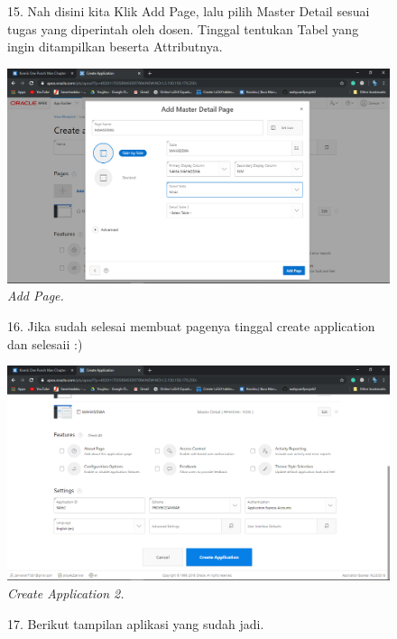 \begin{enumerate}
    \begin{figure}[!htbp]
    \item[15.] Nah disini kita Klik Add Page, lalu pilih Master Detail sesuai tugas yang diperintah oleh dosen. Tinggal tentukan Tabel yang ingin ditampilkan beserta Attributnya.
    \begin{center}
    \includegraphics[scale=0.3]{figures/Screenshot(133).png}
    \caption{\textit{Add Page.}}
    \end{center}   
    \end{figure}
    
    \begin{figure}[!htbp]
    \item[16.] Jika sudah selesai membuat pagenya tinggal create application dan selesaii :)
    \begin{center}
    \includegraphics[scale=0.3]{figures/Screenshot(134).png}
    \caption{\textit{Create Application 2.}}
    \end{center}   
    \end{figure}
    
    \begin{figure}[!htbp]
    \item[17.] Berikut tampilan aplikasi yang sudah jadi.
    

\end{figure}
\end{enumerate}
